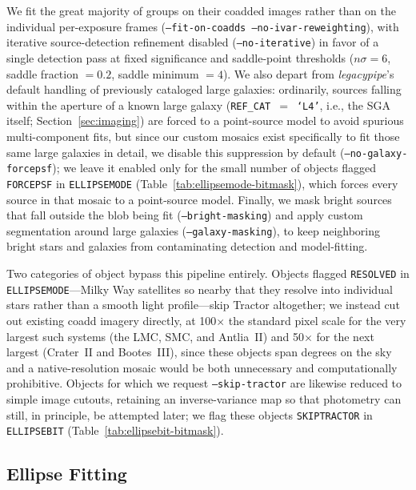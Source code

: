 \documentclass[modern,linenumbers]{aastex701}
\begin{document}
We fit the great majority of groups on their coadded images rather than
on the individual per-exposure frames (\texttt{--fit-on-coadds
--no-ivar-reweighting}), with iterative source-detection refinement
disabled (\texttt{--no-iterative}) in favor of a single detection pass at
fixed significance and saddle-point thresholds ($n\sigma=6$, saddle
fraction $=0.2$, saddle minimum $=4$). We also depart from
\textsl{legacypipe}'s default handling of previously cataloged large
galaxies: ordinarily, sources falling within the aperture of a known
large galaxy (\texttt{REF\_CAT}~$=$~\texttt{`L4'}, i.e., the SGA itself;
Section~\ref{sec:imaging}) are forced to a point-source model to avoid
spurious multi-component fits, but since our custom mosaics exist
specifically to fit those same large galaxies in detail, we disable this
suppression by default (\texttt{--no-galaxy-forcepsf}); we leave it
enabled only for the small number of objects flagged \texttt{FORCEPSF}
in \texttt{ELLIPSEMODE} (Table~\ref{tab:ellipsemode-bitmask}), which
forces every source in that mosaic to a point-source model. Finally, we
mask bright sources that fall outside the blob being fit
(\texttt{--bright-masking}) and apply custom segmentation around large
galaxies (\texttt{--galaxy-masking}), to keep neighboring bright stars
and galaxies from contaminating detection and model-fitting.

Two categories of object bypass this pipeline entirely. Objects flagged
\texttt{RESOLVED} in \texttt{ELLIPSEMODE}---Milky Way satellites so
nearby that they resolve into individual stars rather than a smooth
light profile---skip Tractor altogether; we instead cut out existing
coadd imagery directly, at 100$\times$ the standard pixel scale for the
very largest such systems (the LMC, SMC, and Antlia~II) and 50$\times$
for the next largest (Crater~II and Bootes~III), since these objects
span degrees on the sky and a native-resolution mosaic would be both
unnecessary and computationally prohibitive. Objects for which we
request \texttt{--skip-tractor} are likewise reduced to simple image
cutouts, retaining an inverse-variance map so that photometry can still,
in principle, be attempted later; we flag these objects
\texttt{SKIPTRACTOR} in \texttt{ELLIPSEBIT}
(Table~\ref{tab:ellipsebit-bitmask}).

\subsection{Ellipse Fitting}
\label{sec:pipeline:ellipse}
\end{document}
